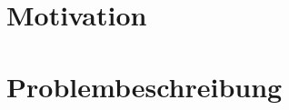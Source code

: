 \documentclass{book}
\begin{document}
\tableofcontents
\chapter{Motivation}
\chapter{Problembeschreibung}
\end{document}
